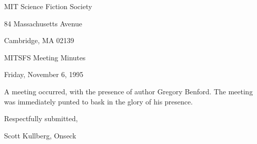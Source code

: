 \documentclass[12pt]{article}
\begin{document}
\begin{center}

MIT Science Fiction Society 

84 Massachusetts Avenue

Cambridge, MA 02139

\vspace{12pt}

MITSFS Meeting Minutes 

Friday, November 6, 1995

\end{center}
 
\vspace{18pt}

\setlength{\parskip}{6pt}

\noindent
A meeting occurred, with the presence of author Gregory Benford. The meeting was immediately punted to bask in the glory of his presence.

\vspace{18pt}

\centerline{Respectfully submitted,}
\centerline{Scott Kullberg, Onseck}
\end{document}
